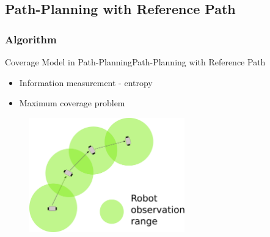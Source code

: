 \subsection{Path-Planning with Reference Path}

\subsubsection{Algorithm}

\begin{frame}{Coverage Model in Path-Planning}{Path-Planning with Reference Path}

\begin{itemize}
\item Information measurement - entropy 
\item Maximum coverage problem
\end{itemize}

\begin{figure}
\centering
\includegraphics[width = 0.6\textwidth]{./figure/robotObservation}
\end{figure}

\end{frame}

